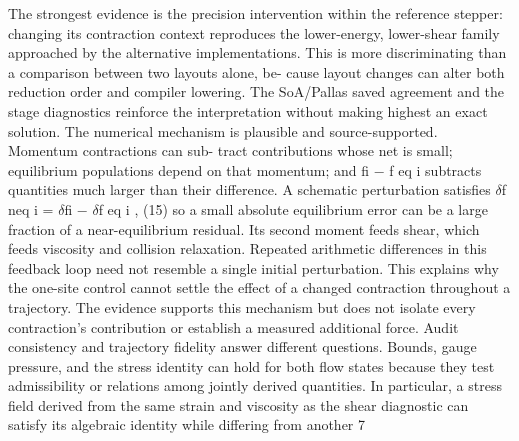 \documentclass[11pt]{article}
\begin{document}
The strongest evidence is the precision intervention within the reference stepper: changing its
contraction context reproduces the lower-energy, lower-shear family approached by the alternative
implementations. This is more discriminating than a comparison between two layouts alone, be-
cause layout changes can alter both reduction order and compiler lowering. The SoA/Pallas saved
agreement and the stage diagnostics reinforce the interpretation without making highest an exact
solution.
The numerical mechanism is plausible and source-supported. Momentum contractions can sub-
tract contributions whose net is small; equilibrium populations depend on that momentum; and
fi \ensuremath{-} f eq
i subtracts quantities much larger than their difference. A schematic perturbation satisfies
\ensuremath{\delta}f neq
i = \ensuremath{\delta}fi \ensuremath{-} \ensuremath{\delta}f eq
i , (15)
so a small absolute equilibrium error can be a large fraction of a near-equilibrium residual. Its
second moment feeds shear, which feeds viscosity and collision relaxation. Repeated arithmetic
differences in this feedback loop need not resemble a single initial perturbation. This explains why
the one-site control cannot settle the effect of a changed contraction throughout a trajectory. The
evidence supports this mechanism but does not isolate every contraction’s contribution or establish
a measured additional force.
Audit consistency and trajectory fidelity answer different questions. Bounds, gauge pressure,
and the stress identity can hold for both flow states because they test admissibility or relations
among jointly derived quantities. In particular, a stress field derived from the same strain and
viscosity as the shear diagnostic can satisfy its algebraic identity while differing from another
7
\end{document}

